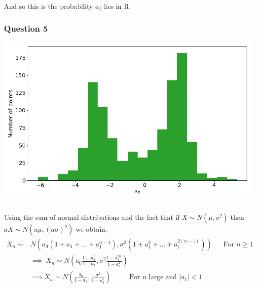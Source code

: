 \documentclass[12pt, a4paper]{article}
\begin{document}
And so this is the probability $a_{1}$ lies in R. \\



\subsubsection*{Question 5}

\begin{minipage}{\textwidth}
	\centering
	\includegraphics[width = \linewidth]{q5_fig1}
	\label{q5_fig1}
\end{minipage}
\\

Using the sum of normal distributions and the fact that if $X \sim N(\mu, \sigma^{2})$ then $aX \sim N(a\mu, (a\sigma)^{2})$ we obtain,
\begin{align*}
	X_{n} \sim & N\left( a_{0}\left(1+a_{1}+...+a_{1}^{n-1}\right), \sigma^{2}\left( 1+a_{1}^{2}+...+a_{1}^{2(n-1)} \right) \right) \text{ ~~~ For $n\geq1$} \\
	& \implies ~ X_{n} \sim N\left( a_{0}\frac{1-a_{1}^{n}}{1-a_{1}}, \sigma^{2}\frac{1-a_{1}^{2n}}{1-a_{1}^{2}} \right) \\
	& \implies X_{n} \sim N\left( \frac{a_{0}}{1-a_{1}}, \frac{\sigma^{2}}{1-a_{1}^{2}} \right) \text{ ~~~~~~ For $n$ large and $|a_{1}|<1$}
\end{align*}
\end{document}
